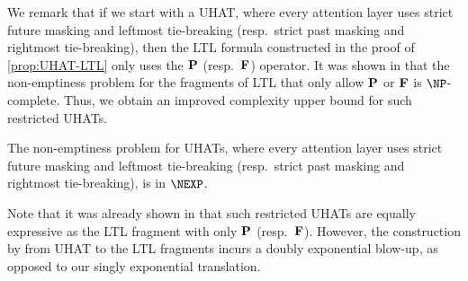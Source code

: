 We remark that if we start with a UHAT, where every attention layer uses strict future masking and leftmost tie-breaking
(resp.\ strict past masking and rightmost tie-breaking),
then the LTL formula constructed in the proof of \cref{prop:UHAT-LTL} only uses the $\textbf{P}$ (resp.\ $\textbf{F}$) operator.
It was shown in \citep{SistlaC85} that the non-emptiness problem for the fragments of LTL 
that only allow $\textbf{P}$ or $\textbf{F}$ is $\NP$-complete.
Thus, we obtain an improved complexity upper bound for such restricted UHATs.
\begin{corollary}
The non-emptiness problem for UHATs, where every attention layer uses strict future masking and leftmost tie-breaking
(resp.\ strict past masking and rightmost tie-breaking), is in $\NEXP$.
\end{corollary}

Note that it was already shown in \citep{tale} that such restricted UHATs 
are equally expressive as the LTL fragment with only $\textbf{P}$ (resp.\ $\textbf{F}$).
However, the construction by \cite{tale} from UHAT to the LTL fragments incurs a doubly exponential blow-up, 
as opposed to our singly exponential translation.
